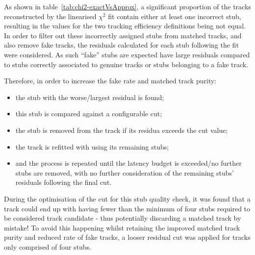 

As shown in table~\ref{tab:chi2-exactVsApprox}, a significant proportion of the tracks reconstructed by the linearised $\chi^{2}$ fit contain either at least one incorrect stub, resulting in the values for the two tracking efficiency definitions being not equal.
In order to filter out these incorrectly assigned stubs from matched tracks, and also remove fake tracks, the residuals calculated for each stub following the fit were considered.
As such ``fake'' stubs are expected have large residuals compared to stubs correctly associated to genuine tracks or stubs belonging to a fake track.

Therefore, in order to increase the fake rate and matched track purity:
\begin{itemize}
\item the stub with the worse/largest residual is found;
\item this stub is compared against a configurable cut;
\item the stub is removed from the track if its residua exceeds the cut value;
\item the track is refitted with using its remaining stubs;
\item and the process is repeated until the latency budget is exceeded/no further stubs are removed, with no further consideration of the remaining stubs' residuals following the final cut.
\end{itemize}

During the optimisation of the cut for this stub quality check, it was found that a track could end up with having fewer than the minimum of four stubs required to be considered track candidate - thus potentially discarding a matched track by mistake!
To avoid this happening whilst retaining the improved matched track purity and reduced rate of fake tracks, a looser residual cut was applied for tracks only comprised of four stubs.


